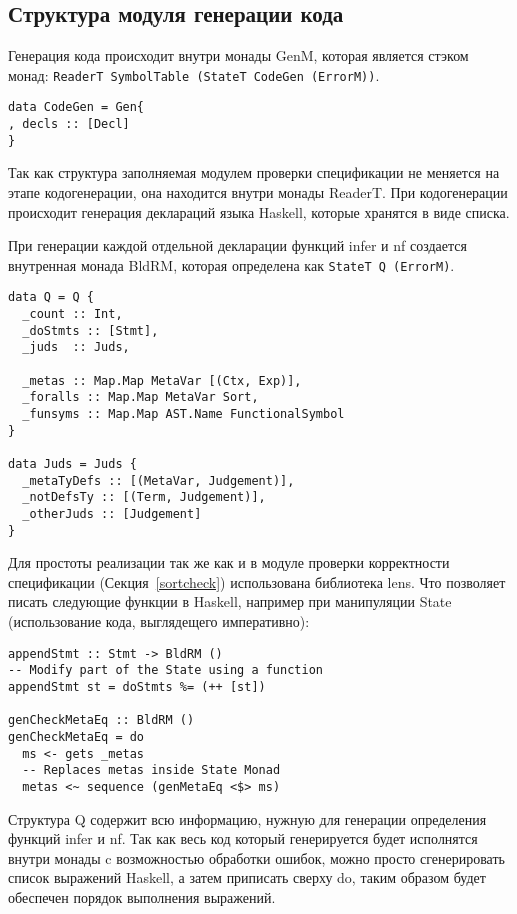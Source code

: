 \subsection{Структура модуля генерации кода}\label{repr}
Генерация кода происходит внутри монады GenM, которая является стэком монад: \lstinline{ReaderT SymbolTable (StateT CodeGen (ErrorM))}.

\begin{lstlisting}[caption={Структура используемая при кодогенерации},captionpos=b,frame=single]
data CodeGen = Gen{
, decls :: [Decl]
}
\end{lstlisting}

Так как структура заполняемая модулем проверки спецификации не меняется на этапе кодогенерации, она находится внутри монады ReaderT. При кодогенерации происходит генерация деклараций языка Haskell, которые хранятся в виде списка.

При генерации каждой отдельной декларации функций infer и nf создается внутренная монада BldRM, которая определена как \lstinline{StateT Q (ErrorM)}.

\begin{lstlisting}[caption={Структура используемая при кодогенерации функции infer},captionpos=b,frame=single]
data Q = Q {
  _count :: Int,
  _doStmts :: [Stmt],
  _juds  :: Juds,

  _metas :: Map.Map MetaVar [(Ctx, Exp)],
  _foralls :: Map.Map MetaVar Sort,
  _funsyms :: Map.Map AST.Name FunctionalSymbol
}

data Juds = Juds {
  _metaTyDefs :: [(MetaVar, Judgement)],
  _notDefsTy :: [(Term, Judgement)],
  _otherJuds :: [Judgement]
}
\end{lstlisting}

Для простоты реализации так же как и в модуле проверки корректности спецификации (Секция~\ref{sortcheck}) использована библиотека lens\cite{lens}. Что позволяет писать следующие функции в Haskell, например при манипуляции State (использование кода, выглядещего императивно):

\begin{lstlisting}[frame=single]
appendStmt :: Stmt -> BldRM ()
-- Modify part of the State using a function
appendStmt st = doStmts %= (++ [st])

genCheckMetaEq :: BldRM ()
genCheckMetaEq = do
  ms <- gets _metas
  -- Replaces metas inside State Monad
  metas <~ sequence (genMetaEq <$> ms)
\end{lstlisting}

Структура Q содержит всю информацию, нужную для генерации определения функций infer и nf. Так как весь код который генерируется будет исполнятся внутри монады c возможностью обработки ошибок, можно просто сгенерировать список выражений Haskell, а затем приписать сверху do, таким образом будет обеспечен порядок выполнения выражений.

